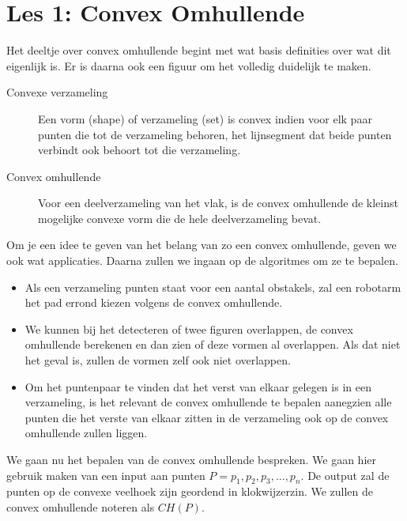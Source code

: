 \documentclass[12pt,a4paper]{article}
\begin{document}
	\section{Les 1: Convex Omhullende}
	Het deeltje over convex omhullende begint met wat basis definities over wat dit eigenlijk is. Er is daarna ook een figuur om het volledig duidelijk te maken. 
		\begin{description}
			\item[Convexe verzameling] Een vorm (shape) of verzameling (set) is convex indien voor elk paar punten die tot de verzameling behoren, het lijnsegment dat beide punten verbindt ook behoort tot die verzameling. 
			\item[Convex omhullende] Voor een deelverzameling van het vlak, is de convex omhullende de kleinst mogelijke convexe vorm die de hele deelverzameling bevat. 
		\end{description}
	Om je een idee te geven van het belang van zo een convex omhullende, geven we ook wat applicaties. Daarna zullen we ingaan op de algoritmes om ze te bepalen. 
		\begin{itemize}
			\item Als een verzameling punten staat voor een aantal obstakels, zal een robotarm het pad 	errond kiezen volgens de convex omhullende. 
			\item We kunnen bij het detecteren of twee figuren overlappen, de convex omhullende berekenen en dan zien of deze vormen al overlappen. Als dat niet het geval is, zullen de vormen zelf ook niet overlappen. 
			\item Om het puntenpaar te vinden dat het verst van elkaar gelegen is in een verzameling, is het relevant de convex omhullende te bepalen aanegzien alle punten die het verste van elkaar zitten in de verzameling ook op de convex omhullende zullen liggen. 
		\end{itemize}
	We gaan nu het bepalen van de convex omhullende bespreken. We gaan hier gebruik maken van een input aan punten \(P = {p_1, p_2, p_3, ..., p_n}\). De output zal de punten op de convexe veelhoek zijn geordend in klokwijzerzin. We zullen de convex omhullende noteren als $CH(P)$.
	
	
\end{document}
